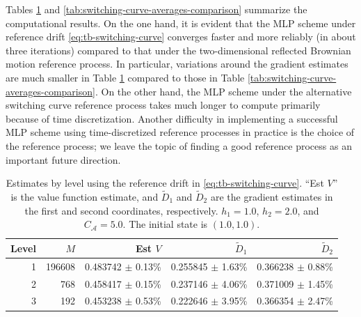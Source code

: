 \documentclass[11pt]{article}
\theoremstyle{definition}
\theoremstyle{plain}
\begin{document}
Tables \ref{tab:switching-curve-averages} and \ref{tab:switching-curve-averages-comparison} summarize the computational results. 
On the one hand, it is evident that the MLP scheme under reference drift \eqref{eq:tb-switching-curve} converges faster and more reliably (in about three iterations)
compared to that under the two-dimensional reflected Brownian motion reference process. 
In particular, variations around the gradient estimates are much smaller in Table \ref{tab:switching-curve-averages} 
compared to those in Table \ref{tab:switching-curve-averages-comparison}. On the other hand, 
the MLP scheme under the alternative switching curve reference process 
takes much longer to compute primarily because of time discretization. 
Another difficulty in implementing a successful MLP scheme using time-discretized reference processes in practice 
is the choice of the reference process; we leave the topic of finding a good reference process as an important future direction. 
\begin{table}[t]
  \centering
  \caption{Estimates by level using the reference drift in \eqref{eq:tb-switching-curve}. 
  ``Est $V$'' is the value function estimate, and $\tilde D_1$ and $\tilde D_2$ 
  are the gradient estimates in the first and second coordinates, respectively. 
  $h_1 = 1.0$, $h_2 = 2.0$, and $C_{\mathcal{A}} = 5.0$. The initial state is $(1.0, 1.0)$.} 
  \label{tab:switching-curve-averages}
  \begin{tabular}{r r r r r}
    \toprule
    Level & $M$ & Est $V$ & $\tilde D_1$ & $\tilde D_2$ \\
    \midrule
    1 & 196608 & 0.483742 $\pm$ 0.13\% & 0.255845 $\pm$ 1.63\% & 0.366238 $\pm$ 0.88\% \\
    2 & 768 & 0.458417 $\pm$ 0.15\% & 0.237146 $\pm$ 4.06\% & 0.371009 $\pm$ 1.45\% \\
    3 & 192 & 0.453238 $\pm$ 0.53\% & 0.222646 $\pm$ 3.95\% & 0.366354 $\pm$ 2.47\% \\
    \bottomrule
  \end{tabular}
\end{table}
\end{document}

